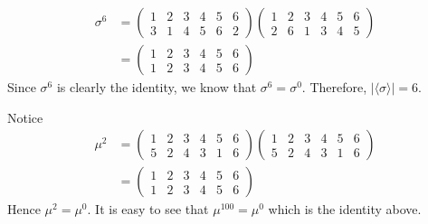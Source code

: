 \documentclass[12pt]{article}
\begin{document}
\begin{problem}[8.6]
\begin{align*}
	   \sigma^{6} &= \begin{pmatrix} 1&2&3&4&5&6\\3&1&4&5&6&2\end{pmatrix} \begin{pmatrix} 1&2&3&4&5&6\\2&6&1&3&4&5 \end{pmatrix}  \\
	   &= \begin{pmatrix} 1&2&3&4&5&6\\1&2&3&4&5&6 \end{pmatrix}  
\end{align*}
Since $ \sigma^{6}$ is clearly the identity, we know that $ \sigma^{6}= \sigma^{0}$. Therefore, $ |\langle \sigma \rangle| = 6$.
\end{problem}
\begin{problem}[8.9]
Notice
\begin{align*}
	\mu^2 &= \begin{pmatrix} 1&2&3&4&5&6\\5&2&4&3&1&6 \end{pmatrix}  \begin{pmatrix} 1&2&3&4&5&6\\5&2&4&3&1&6 \end{pmatrix}\\ 
	&=   \begin{pmatrix} 1&2&3&4&5&6\\1&2&3&4&5&6 \end{pmatrix} 
\end{align*}
Hence $ \mu^2=\mu^0$. It is easy to see that $ \mu^{100} = \mu^0$ which is the identity above. 
\end{problem}
\end{document}
